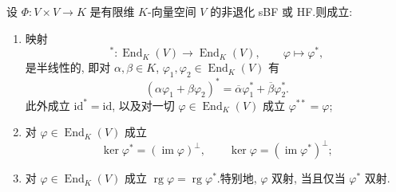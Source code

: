 \begin{corollary}\label{cor:7.4.3}
设 $\varPhi \colon V \times V \longrightarrow K$ 是有限维 $K$-向量空间 $V$ 的非退化 sBF 或 HF.则成立:
\begin{enumerate}
\item[(i)] 映射
\[
{}^{*} \colon \operatorname{End}_K(V) \longrightarrow \operatorname{End}_K(V), \qquad \varphi \longmapsto \varphi^*,
\]
是半线性的, 即对 $\alpha, \beta \in K$, $\varphi_1, \varphi_2 \in \operatorname{End}_K(V)$ 有
\[
(\alpha \varphi_1 + \beta \varphi_2)^* = \overline{\alpha} \varphi_1^* + \overline{\beta} \varphi_2^*\text{.}
\]
此外成立 $\mathrm{id}^* = \mathrm{id}$, 以及对一切 $\varphi \in \operatorname{End}_K(V)$ 成立 $\varphi^{**} = \varphi$;
\item[(ii)] 对 $\varphi \in \operatorname{End}_K(V)$ 成立
\[
\ker \varphi^* = (\operatorname{im} \varphi)^{\perp}, \qquad \ker \varphi = (\operatorname{im} \varphi^*)^{\perp};
\]
\item[(iii)] 对 $\varphi \in \operatorname{End}_K(V)$ 成立 $\operatorname{rg} \varphi = \operatorname{rg} \varphi^*$.特别地, $\varphi$ 双射, 当且仅当 $\varphi^*$ 双射.
\end{enumerate}
\end{corollary}


